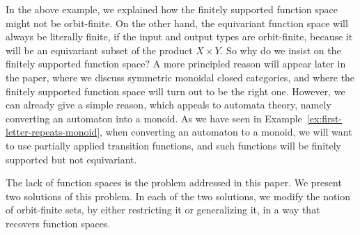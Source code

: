 In the above example, we explained how the finitely supported function space might not be orbit-finite. On the other hand, the equivariant function space will always be literally finite, if the input and output types are orbit-finite, because it will be an equivariant subset of the product $X \times Y$. So why do we insist on the finitely supported function space? A more principled reason will appear later in the paper, where we discuss symmetric monoidal closed categories, and where the finitely supported function space will turn out to be the right one. However, we can already give a simple reason, which appeals to automata theory, namely converting an automaton into a monoid. As we have seen in Example~\ref{ex:first-letter-repeats-monoid}, when converting an automaton to a monoid, we will want to use partially applied transition functions, and such functions will be finitely supported but not equivariant. 



 

The lack of function spaces is the problem  addressed in this paper. We present two solutions of this problem. In each of the two solutions, we modify the notion of orbit-finite sets, by either restricting it or generalizing it, in a way that recovers function spaces. 



